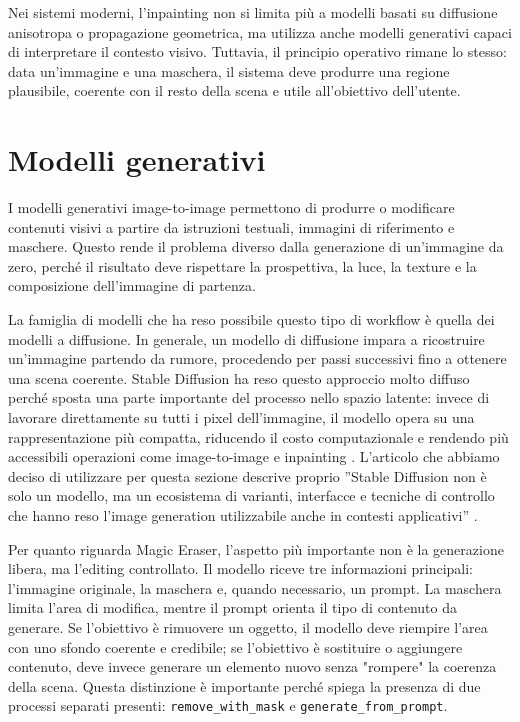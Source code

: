 \documentclass[oneside]{supsistudent}
\begin{document}
Nei sistemi moderni, l'inpainting non si limita più a modelli basati su
diffusione anisotropa o propagazione geometrica, ma utilizza anche
modelli generativi capaci di interpretare il contesto visivo. Tuttavia, il
principio operativo rimane lo stesso: data un'immagine e una
maschera, il sistema deve produrre una regione plausibile, coerente con il resto
della scena e utile all'obiettivo dell'utente.


\section{Modelli generativi}

I modelli generativi image-to-image permettono di produrre o modificare
contenuti visivi a partire da istruzioni testuali, immagini di
riferimento e maschere. Questo rende il problema diverso dalla
generazione di un'immagine da zero, perché il risultato deve
rispettare la prospettiva, la luce, la texture e la composizione dell'immagine
di partenza.

\vspace{\baselineskip}

La famiglia di modelli che ha reso possibile questo tipo di workflow è
quella dei modelli a diffusione. In generale, un modello
di diffusione impara a ricostruire un'immagine partendo da rumore, procedendo
per passi successivi fino a ottenere una scena coerente.
Stable Diffusion ha reso questo approccio molto diffuso perché sposta una
parte importante del processo nello spazio latente: invece di
lavorare direttamente su tutti i pixel dell'immagine, il modello opera su una
rappresentazione più compatta, riducendo il costo
computazionale e rendendo più accessibili operazioni come
image-to-image e inpainting \cite{latent-diffusion}.
L'articolo che abbiamo deciso di utilizzare per questa sezione
descrive proprio ''Stable Diffusion
non è solo un modello, ma un ecosistema di varianti,
interfacce e tecniche di controllo che hanno reso l'image generation utilizzabile
anche in contesti applicativi'' \cite{bentoml-generative-models}.

\vspace{\baselineskip}

Per quanto riguarda Magic Eraser, l'aspetto più importante non è la generazione
libera, ma l'editing controllato. Il modello riceve tre informazioni principali:
l'immagine originale, la maschera e, quando necessario, un prompt.
La maschera limita l'area di modifica, mentre il prompt orienta
il tipo di contenuto da generare. Se l'obiettivo è rimuovere un oggetto,
il modello deve riempire l'area con uno sfondo coerente e credibile; se
l'obiettivo è sostituire o aggiungere contenuto, deve invece generare un
elemento nuovo senza "rompere" la coerenza della scena. Questa
distinzione è importante perché spiega la presenza di due processi separati
presenti: \texttt{remove\_with\_mask} e
\texttt{generate\_from\_prompt}.
\end{document}
